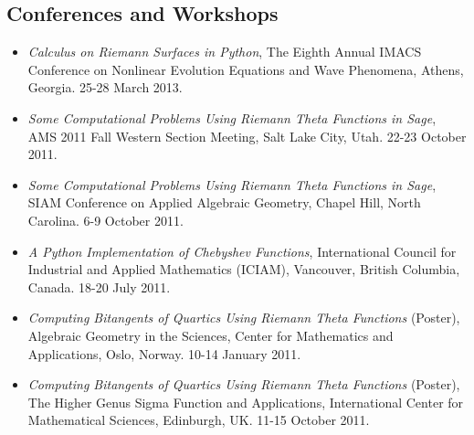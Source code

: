 \documentclass{article}
\begin{document}
\subsection*{Conferences and Workshops}
\begin{itemize}
  \item {\it Calculus on Riemann Surfaces in Python}, The Eighth
    Annual IMACS Conference on Nonlinear Evolution Equations and Wave
    Phenomena, Athens, Georgia. 25-28 March 2013.
  \item {\it Some Computational Problems Using Riemann Theta
    Functions in Sage}, AMS 2011 Fall Western Section Meeting, Salt
    Lake City, Utah. 22-23 October 2011.
  \item {\it Some Computational Problems Using Riemann Theta
    Functions in Sage}, SIAM Conference on Applied Algebraic
    Geometry, Chapel Hill, North Carolina. 6-9 October 2011.
  \item {\it A Python Implementation of Chebyshev Functions},
    International Council for Industrial and Applied Mathematics
    (ICIAM), Vancouver, British Columbia, Canada. 18-20 July 2011.
  \item {\it Computing Bitangents of Quartics Using Riemann Theta
    Functions} (Poster), Algebraic Geometry in the Sciences, Center
    for Mathematics and Applications, Oslo, Norway. 10-14 January
    2011.
  \item {\it Computing Bitangents of Quartics Using Riemann Theta
    Functions} (Poster), The Higher Genus Sigma Function and
    Applications, International Center for Mathematical Sciences,
    Edinburgh, UK. 11-15 October 2011.
\end{itemize}
\end{document}
